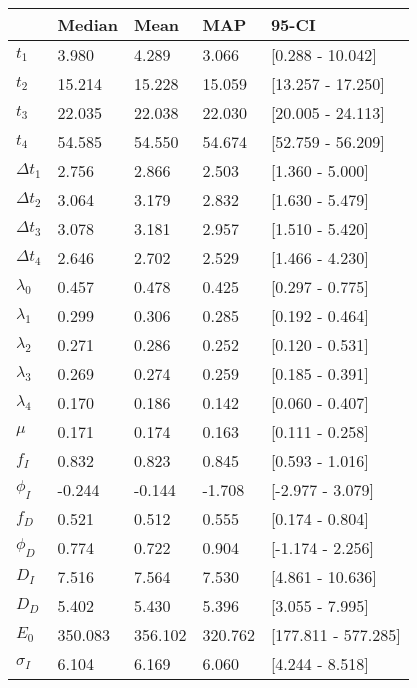 \begin{tabular}{lllll}
\toprule
{} &   Median &     Mean &      MAP &                95-CI \\
\midrule
$t_1$        &    3.980 &    4.289 &    3.066 &     [0.288 - 10.042] \\
$t_2$        &   15.214 &   15.228 &   15.059 &    [13.257 - 17.250] \\
$t_3$        &   22.035 &   22.038 &   22.030 &    [20.005 - 24.113] \\
$t_4$        &   54.585 &   54.550 &   54.674 &    [52.759 - 56.209] \\
$\Delta t_1$ &    2.756 &    2.866 &    2.503 &      [1.360 - 5.000] \\
$\Delta t_2$ &    3.064 &    3.179 &    2.832 &      [1.630 - 5.479] \\
$\Delta t_3$ &    3.078 &    3.181 &    2.957 &      [1.510 - 5.420] \\
$\Delta t_4$ &    2.646 &    2.702 &    2.529 &      [1.466 - 4.230] \\
$\lambda_0$  &    0.457 &    0.478 &    0.425 &      [0.297 - 0.775] \\
$\lambda_1$  &    0.299 &    0.306 &    0.285 &      [0.192 - 0.464] \\
$\lambda_2$  &    0.271 &    0.286 &    0.252 &      [0.120 - 0.531] \\
$\lambda_3$  &    0.269 &    0.274 &    0.259 &      [0.185 - 0.391] \\
$\lambda_4$  &    0.170 &    0.186 &    0.142 &      [0.060 - 0.407] \\
$\mu$        &    0.171 &    0.174 &    0.163 &      [0.111 - 0.258] \\
$f_I$        &    0.832 &    0.823 &    0.845 &      [0.593 - 1.016] \\
$\phi_I$     &   -0.244 &   -0.144 &   -1.708 &     [-2.977 - 3.079] \\
$f_D$        &    0.521 &    0.512 &    0.555 &      [0.174 - 0.804] \\
$\phi_D$     &    0.774 &    0.722 &    0.904 &     [-1.174 - 2.256] \\
$D_I$        &    7.516 &    7.564 &    7.530 &     [4.861 - 10.636] \\
$D_D$        &    5.402 &    5.430 &    5.396 &      [3.055 - 7.995] \\
$E_0$        &  350.083 &  356.102 &  320.762 &  [177.811 - 577.285] \\
$\sigma_I$   &    6.104 &    6.169 &    6.060 &      [4.244 - 8.518] \\

\end{tabular}
